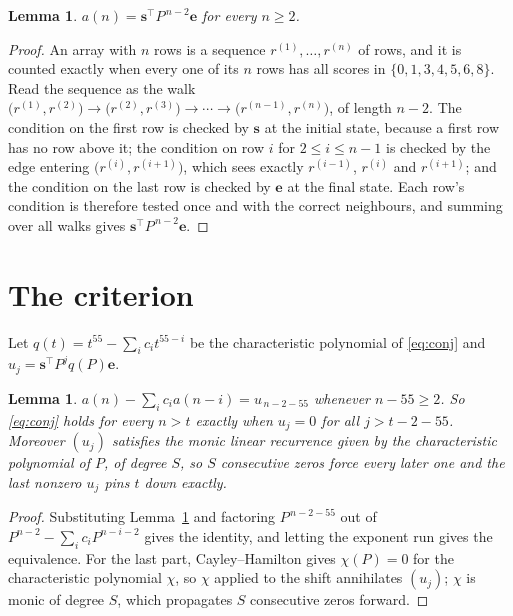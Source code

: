 \documentclass[11pt,a4paper]{article}
\theoremstyle{plain}
\newtheorem{lemma}[theorem]{Lemma}
\theoremstyle{definition}
\begin{document}
\begin{lemma}\label{lem:walk}
$a(n)=\mathbf{s}^{\!\top}P^{\,n-2}\mathbf{e}$ for every $n\ge2$.
\end{lemma}

\begin{proof}
An array with $n$ rows is a sequence $r^{(1)},\dots,r^{(n)}$ of rows, and it is counted
exactly when every one of its $n$ rows has all scores in $\{0,1,3,4,5,6,8\}$. Read the sequence as the
walk $\bigl(r^{(1)},r^{(2)}\bigr)\to\bigl(r^{(2)},r^{(3)}\bigr)\to\cdots\to
\bigl(r^{(n-1)},r^{(n)}\bigr)$, of length $n-2$. The condition on the first row is
checked by $\mathbf{s}$ at the initial state, because a first row has no row above it; the
condition on row $i$ for $2\le i\le n-1$ is checked by the edge entering
$\bigl(r^{(i)},r^{(i+1)}\bigr)$, which sees exactly $r^{(i-1)}$, $r^{(i)}$ and
$r^{(i+1)}$; and the condition on the last row is checked by $\mathbf{e}$ at the final
state. Each row's condition is therefore tested once and with the correct neighbours, and
summing over all walks gives $\mathbf{s}^{\!\top}P^{\,n-2}\mathbf{e}$.
\end{proof}

\section{The criterion}

Let $q(t)=t^{55}-\sum_i c_i t^{55-i}$ be the characteristic polynomial of
\eqref{eq:conj} and $u_j=\mathbf{s}^{\!\top}P^{j}q(P)\mathbf{e}$.

\begin{lemma}\label{lem:crit}
$a(n)-\sum_i c_i a(n-i)=u_{\,n-2-55}$ whenever $n-55\ge2$. So \eqref{eq:conj}
holds for every $n>t$ exactly when $u_j=0$ for all $j>t-2-55$. Moreover $(u_j)$
satisfies the monic linear recurrence given by the characteristic polynomial of $P$, of
degree $S$, so $S$ consecutive zeros force every later one and the last nonzero $u_j$ pins
$t$ down exactly.
\end{lemma}

\begin{proof}
Substituting Lemma~\ref{lem:walk} and factoring $P^{\,n-2-55}$ out of
$P^{n-2}-\sum_i c_i P^{n-i-2}$ gives the identity, and letting the exponent run gives the
equivalence. For the last part, Cayley--Hamilton gives $\chi(P)=0$ for the characteristic
polynomial $\chi$, so $\chi$ applied to the shift annihilates $(u_j)$; $\chi$ is monic of
degree $S$, which propagates $S$ consecutive zeros forward.
\end{proof}
\end{document}
